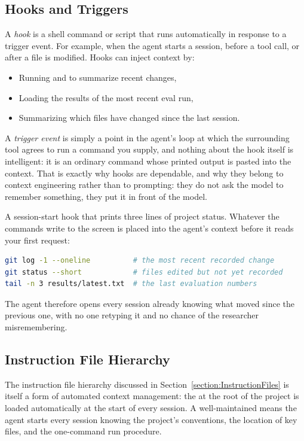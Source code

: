 \subsection{Hooks and Triggers}

A \emph{hook} is a shell command or script that runs automatically in response to a trigger event.
For example, when the agent starts a session, before a tool call, or after a file is modified.
Hooks can inject context by:
\begin{itemize}
\item Running  and  to summarize recent changes,
\item Loading the results of the most recent eval run,
\item Summarizing which files have changed since the last session.
\end{itemize}

A \emph{trigger event} is simply a point in the agent's loop at which the surrounding tool agrees to run a command you supply, and nothing about the hook itself is intelligent: it is an ordinary command whose printed output is pasted into the context.
That is exactly why hooks are dependable, and why they belong to context engineering rather than to prompting: they do not ask the model to remember something, they put it in front of the model.

\begin{example}
A session-start hook that prints three lines of project status.
Whatever the commands write to the screen is placed into the agent's context before it reads your first request:
\begin{lstlisting}[language=bash]
git log -1 --oneline          # the most recent recorded change
git status --short            # files edited but not yet recorded
tail -n 3 results/latest.txt  # the last evaluation numbers
\end{lstlisting}
The agent therefore opens every session already knowing what moved since the previous one, with no one retyping it and no chance of the researcher misremembering.
\end{example}

\subsection{Instruction File Hierarchy}

The instruction file hierarchy discussed in Section~\ref{section:InstructionFiles} is itself a form of automated context management: the  at the root of the project is loaded automatically at the start of every session.
A well-maintained  means the agent starts every session knowing the project's conventions, the location of key files, and the one-command run procedure.

